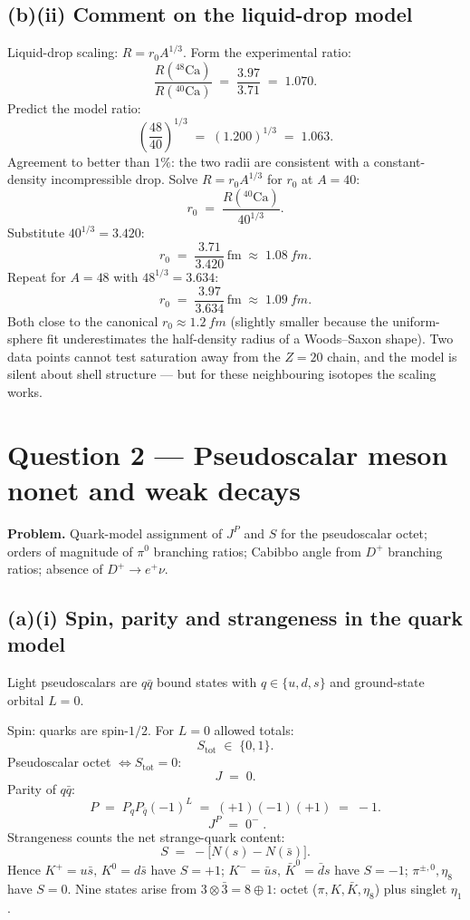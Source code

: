 \documentclass[11pt]{article}
\begin{document}
\subsection*{(b)(ii) Comment on the liquid-drop model}

Liquid-drop scaling: $R=r_{0}A^{1/3}$. Form the experimental ratio:
\[
\frac{R(^{48}\!\text{Ca})}{R(^{40}\!\text{Ca})}\;=\;\frac{3.97}{3.71}\;=\;1.070.
\]
Predict the model ratio:
\[
\left(\frac{48}{40}\right)^{1/3}\;=\;(1.200)^{1/3}\;=\;1.063.
\]
Agreement to better than $1\%$: the two radii are consistent with a constant-density incompressible drop. Solve $R=r_{0}A^{1/3}$ for $r_{0}$ at $A=40$:
\[
r_{0}\;=\;\frac{R(^{40}\!\text{Ca})}{40^{1/3}}.
\]
Substitute $40^{1/3}=3.420$:
\[
r_{0}\;=\;\frac{3.71}{3.420}\,\text{fm}\;\approx\;\SI{1.08}{fm}.
\]
Repeat for $A=48$ with $48^{1/3}=3.634$:
\[
r_{0}\;=\;\frac{3.97}{3.634}\,\text{fm}\;\approx\;\SI{1.09}{fm}.
\]
Both close to the canonical $r_{0}\approx\SI{1.2}{fm}$ (slightly smaller because the uniform-sphere fit underestimates the half-density radius of a Woods--Saxon shape). Two data points cannot test saturation away from the $Z=20$ chain, and the model is silent about shell structure --- but for these neighbouring isotopes the scaling works.

\section*{Question 2 --- Pseudoscalar meson nonet and weak decays}

\textbf{Problem.} Quark-model assignment of $J^{P}$ and $S$ for the pseudoscalar octet; orders of magnitude of $\pi^{0}$ branching ratios; Cabibbo angle from $D^{+}$ branching ratios; absence of $D^{+}\to e^{+}\nu$.

\subsection*{(a)(i) Spin, parity and strangeness in the quark model}

Light pseudoscalars are $q\bar q$ bound states with $q\in\{u,d,s\}$ and ground-state orbital $L=0$.

Spin: quarks are spin-$1/2$. For $L=0$ allowed totals:
\[
S_\text{tot}\;\in\;\{0,1\}.
\]
Pseudoscalar octet $\Leftrightarrow S_\text{tot}=0$:
\[
J\;=\;0.
\]
Parity of $q\bar q$:
\[
P\;=\;P_{q}P_{\bar q}(-1)^{L}\;=\;(+1)(-1)(+1)\;=\;-1.
\]
\[
\boxed{\;J^{P}\;=\;0^{-}\;.}
\]
Strangeness counts the net strange-quark content:
\[
S\;=\;-\bigl[N(s)-N(\bar s)\bigr].
\]
Hence $K^{+}=u\bar s,\,K^{0}=d\bar s$ have $S=+1$; $K^{-}=\bar u s,\,\bar K^{0}=\bar d s$ have $S=-1$; $\pi^{\pm,0},\eta_{8}$ have $S=0$. Nine states arise from $3\otimes\bar 3=8\oplus 1$: octet ($\pi,K,\bar K,\eta_{8}$) plus singlet $\eta_{1}$.
\end{document}
